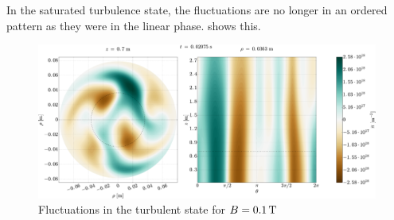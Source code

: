 %
In the saturated turbulence state, the fluctuations are no longer in an ordered pattern as they were in the linear phase.
 shows this.
%
\begin{figure}[htb]
    \centering
    \includegraphics[width=1.0\textwidth]{fig/results/2DTurbulence/fluct}
    \caption{Fluctuations in the turbulent state for $B=0.1\, \text{T}$}
    \label{fig:2DFluct}
\end{figure}
%
